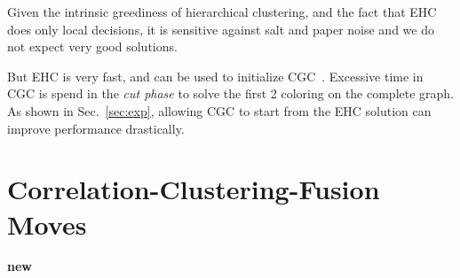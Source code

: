 \documentclass[10pt,twocolumn,letterpaper]{article}
\begin{document}
Given the intrinsic greediness of hierarchical clustering, 
and the fact that EHC does only local decisions, it is 
sensitive against salt and paper noise 
and we do not expect very good solutions.

But EHC is very fast, and can be used to initialize
CGC~\cite{beier_2014_cvpr}. Excessive time in CGC
is spend in the \emph{cut phase} to solve the 
first 2 coloring on the complete graph.
As shown in Sec.~\ref{sec:exp},
allowing CGC to start from the EHC solution
can improve performance drastically.




\section{Correlation-Clustering-Fusion Moves}\label{sec:cc_fm}




\textbf{new}
\end{document}
